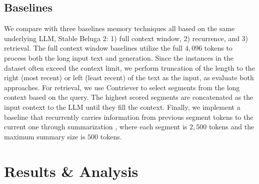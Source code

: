 \subsection{Baselines}
We compare with three baselines memory techniques all based on the same underlying LLM, Stable Beluga 2: 1) full context window, 2) recurrence, and 3) retrieval.
The full context window baselines utilize the full $4,096$ tokens to process both the long input text and generation. Since the instances in the dataset often exceed the context limit, we perform truncation of the length to the right (most recent) or left (least recent) of the text as the input, as evaluate both approaches. For retrieval, we use Contriever \citep{izacard2022unsupervised} to select segments from the long context based on the query. The highest scored segments are concatenated as the input context to the LLM until they fill the context. 
Finally, we implement a baseline that recurrently carries information from previous segment tokens to the current one through summarization \citep{xu2022beyond}, where each segment is $2,500$ tokens and the maximum summary size is $500$ tokens.
\section{Results \& Analysis}\label{sec:results}

\begin{table*}[t]
    \centering 
    \caption{
        Results on the three question answering tasks, reporting test accuracy. Orig. denotes using the entire dataset and Long denotes the subset of longer sequences. 
        Top: comparison to open long context models. Bottom: baselines and \sysname{} performance, with all methods using the underlying Stable Beluga 2 LLM with a maximum $4,096$-token context length. \sysname{}~outperforms all other systems on longer sequences.
    }
    \label{table:main_results}
\end{table*}
